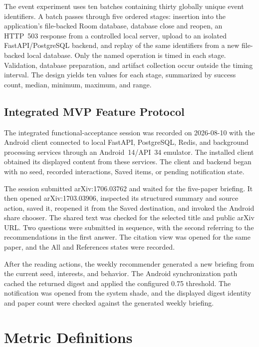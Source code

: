 The event experiment uses ten batches containing thirty globally unique event
identifiers. A batch passes through five ordered stages: insertion into
the application's file-backed Room database, database close and reopen, an
HTTP~503 response from a controlled local server, upload to an isolated
FastAPI/PostgreSQL backend, and replay of the same identifiers from a new
file-backed local database. Only the named operation is timed in each stage.
Validation, database preparation, and artifact collection occur outside the
timing interval. The design yields ten values for each stage, summarized by
success count, median, minimum, maximum, and range.

\subsection{Integrated MVP Feature Protocol}

The integrated functional-acceptance session was recorded on 2026-08-10 with the
Android client connected to local FastAPI, PostgreSQL, Redis, and background
processing services through an Android~14/API~34 emulator. The installed client
obtained its displayed content from these services. The client and backend began
with no seed, recorded interactions, Saved items, or pending notification state.

The session submitted arXiv:1706.03762 and waited for the five-paper briefing.
It then opened arXiv:1703.03906, inspected its structured summary and source
action, saved it, reopened it from the Saved destination, and invoked the Android
share chooser. The shared text was checked for the selected title and public
arXiv URL. Two questions were submitted in sequence, with the second referring
to the recommendations in the first answer. The citation view was opened for
the same paper, and the All and References states were recorded.

After the reading actions, the weekly recommender generated a new briefing from
the current seed, interests, and behavior. The Android synchronization path
cached the returned digest and applied the configured 0.75 threshold. The
notification was opened from the system shade, and the displayed digest identity
and paper count were checked against the generated weekly briefing.

\section{Metric Definitions}


